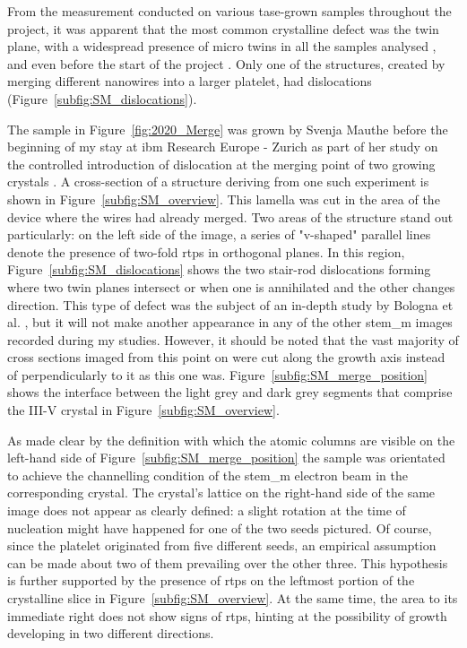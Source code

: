 From the measurement conducted on various \acs{tase}-grown samples throughout the project, it was apparent that the most common crystalline defect was the twin plane, with a widespread presence of micro twins in all the samples analysed \cite{Brugnolotto2023, Brugnolotto2023_2}, and even before the start of the project \cite{Staudinger2018}. Only one of the structures, created by merging different nanowires into a larger platelet, had dislocations (Figure~\ref{subfig:SM_dislocations}). 
\par
The sample in Figure~\ref{fig:2020_Merge} was grown by Svenja Mauthe before the beginning of my stay at \acs{ibm} Research Europe - Zurich as part of her study on the controlled introduction of dislocation at the merging point of two growing crystals \cite{Mauthe2021}. A cross-section of a structure deriving from one such experiment is shown in Figure~\ref{subfig:SM_overview}. This lamella was cut in the area of the device where the wires had already merged. Two areas of the structure stand out particularly: on the left side of the image, a series of "v-shaped" parallel lines denote the presence of two-fold \acf{rtp}s in orthogonal  planes. In this region, Figure~\ref{subfig:SM_dislocations} shows the two stair-rod dislocations forming where two twin planes intersect or when one is annihilated and the other changes direction. This type of defect was the subject of an in-depth study by Bologna et al. \cite{Bologna2018}, but it will not make another appearance in any of the other \acf{stem_m} images recorded during my studies. However, it should be noted that the vast majority of cross sections imaged from this point on were cut along the growth axis instead of perpendicularly to it as this one was. Figure~\ref{subfig:SM_merge_position} shows the interface between the light grey and dark grey segments that comprise the III-V crystal in Figure~\ref{subfig:SM_overview}. 
\par
As made clear by the definition with which the atomic columns are visible on the left-hand side of Figure~\ref{subfig:SM_merge_position} the sample was orientated to achieve the channelling condition of the \acs{stem_m} electron beam in the corresponding crystal. The crystal's lattice on the right-hand side of the same image does not appear as clearly defined: a slight rotation at the time of nucleation might have happened for one of the two seeds pictured. Of course, since the platelet originated from five different seeds, an empirical assumption can be made about two of them prevailing over the other three. This hypothesis is further supported by the presence of \acs{rtp}s on the leftmost portion of the crystalline slice in Figure~\ref{subfig:SM_overview}. At the same time, the area to its immediate right does not show signs of \acs{rtp}s, hinting at the possibility of growth developing in two different directions. 

